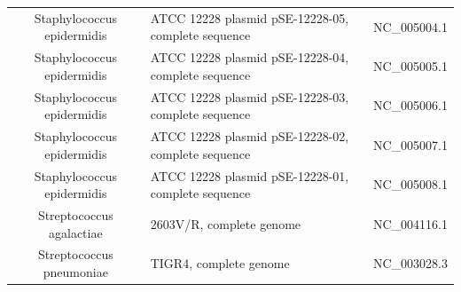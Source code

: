 \documentclass[10pt]{bmc_article}
\newenvironment{bmcformat}{\begin{raggedright}\baselineskip20pt\sloppy\setboolean{publ}{false}}{\end{raggedright}\baselineskip20pt\sloppy}
\begin{document}
\begin{bmcformat}
{\begin{tabular}{|c|p{5cm}|c|}
        Staphylococcus epidermidis & ATCC 12228 plasmid pSE-12228-05, complete sequence &   NC\_005004.1 \\
        Staphylococcus epidermidis & ATCC 12228 plasmid pSE-12228-04, complete sequence &   NC\_005005.1 \\
        Staphylococcus epidermidis & ATCC 12228 plasmid pSE-12228-03, complete sequence &   NC\_005006.1 \\
        Staphylococcus epidermidis & ATCC 12228 plasmid pSE-12228-02, complete sequence &   NC\_005007.1 \\
        Staphylococcus epidermidis & ATCC 12228 plasmid pSE-12228-01, complete sequence &   NC\_005008.1 \\
        Streptococcus agalactiae & 2603V/R, complete genome & NC\_004116.1 \\
        Streptococcus pneumoniae & TIGR4, complete genome & NC\_003028.3 \\
	\hline
      \end{tabular}
      }

\end{bmcformat}
\end{document}

